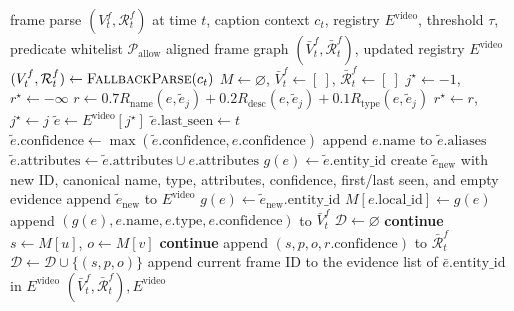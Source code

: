 \documentclass[sigconf, screen, review, anonymous]{acmart}
\begin{document}
\begin{algorithm}[t]
\caption{Stage-1 Entity Alignment into Video-Level Registry}
\label{alg:app-align}
\footnotesize
\begin{algorithmic}[1]
\Require frame parse $(V_t^f,\mathcal{R}_t^f)$ at time $t$, caption context $c_t$, registry $E^{\text{video}}$, threshold $\tau$, predicate whitelist $\mathcal{P}_{\mathrm{allow}}$
\Ensure aligned frame graph $(\bar V_t^f,\bar{\mathcal{R}}_t^f)$, updated registry $E^{\text{video}}$
    \State $(V_t^f,\mathcal{R}_t^f) \gets \textsc{FallbackParse}(c_t)$
\EndIf
\State $M \gets \varnothing$, $\bar V_t^f \gets [\ ]$, $\bar{\mathcal{R}}_t^f \gets [\ ]$
    \State $j^\star \gets -1$, $r^\star \gets -\infty$
        \State $r \gets 0.7R_{\mathrm{name}}(e,\tilde e_j) + 0.2R_{\mathrm{desc}}(e,\tilde e_j) + 0.1R_{\mathrm{type}}(e,\tilde e_j)$
            \State $r^\star \gets r$, $j^\star \gets j$
        \EndIf
    \EndFor
        \State $\tilde e \gets E^{\text{video}}[j^\star]$
        \State $\tilde e.\mathrm{last\_seen} \gets t$
        \State $\tilde e.\mathrm{confidence} \gets \max(\tilde e.\mathrm{confidence}, e.\mathrm{confidence})$
            \State append $e.\mathrm{name}$ to $\tilde e.\mathrm{aliases}$
        \EndIf
        \State $\tilde e.\mathrm{attributes} \gets \tilde e.\mathrm{attributes} \cup e.\mathrm{attributes}$
        \State $g(e) \gets \tilde e.\mathrm{entity\_id}$
    \Else
        \State create $\tilde e_{\mathrm{new}}$ with new ID, canonical name, type, attributes, confidence, first/last seen, and empty evidence
        \State append $\tilde e_{\mathrm{new}}$ to $E^{\text{video}}$
        \State $g(e) \gets \tilde e_{\mathrm{new}}.\mathrm{entity\_id}$
    \EndIf
    \State $M[e.\mathrm{local\_id}] \gets g(e)$
    \State append $(g(e), e.\mathrm{name}, e.\mathrm{type}, e.\mathrm{confidence})$ to $\bar V_t^f$
\EndFor
\State $\mathcal{D} \gets \varnothing$
        \State \textbf{continue}
    \EndIf
    \State $s \gets M[u]$, $o \gets M[v]$
        \State \textbf{continue}
    \EndIf
    \State append $(s,p,o,r.\mathrm{confidence})$ to $\bar{\mathcal{R}}_t^f$
    \State $\mathcal{D} \gets \mathcal{D} \cup \{(s,p,o)\}$
\EndFor
{}
    \State append current frame ID to the evidence list of $\bar e.\mathrm{entity\_id}$ in $E^{\text{video}}$
\EndFor
\State \Return $(\bar V_t^f,\bar{\mathcal{R}}_t^f), E^{\text{video}}$
\end{algorithmic}
\end{algorithm}
\end{document}
